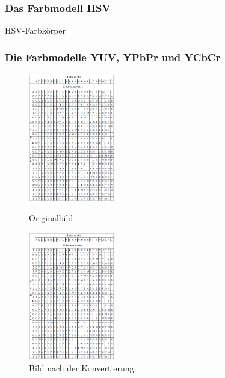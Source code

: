 \documentclass[a4paper,12pt,abstracton,titlepage]{scrartcl}
\begin{document}
\subsubsection{Das Farbmodell HSV}
\begin{floatingfigure}[r]{8.3cm}
	\caption{HSV-Farbkörper}
	\label{hsv}
\end{floatingfigure} 


\vspace{1em}
\subsubsection{Die Farbmodelle YUV, YPbPr und YCbCr}



\begin{figure}[htbp]
\begin{minipage}[t]{0.48\textwidth}
  \begin{center}
    \includegraphics[height=5.6cm]{./Pictures/tableauVigenere.png}
    \caption{Originalbild}
    \label{originalScot}
  \end{center}
\end{minipage}
\begin{minipage}[t]{0.52\textwidth}
  \begin{center}
    \includegraphics[height=5.6cm]{./Pictures/tableauVigenere.png}
    \caption{Bild nach der Konvertierung}
    \label{rgb2hsv}
  \end{center}
\end{minipage}
\end{figure}
\end{document}
